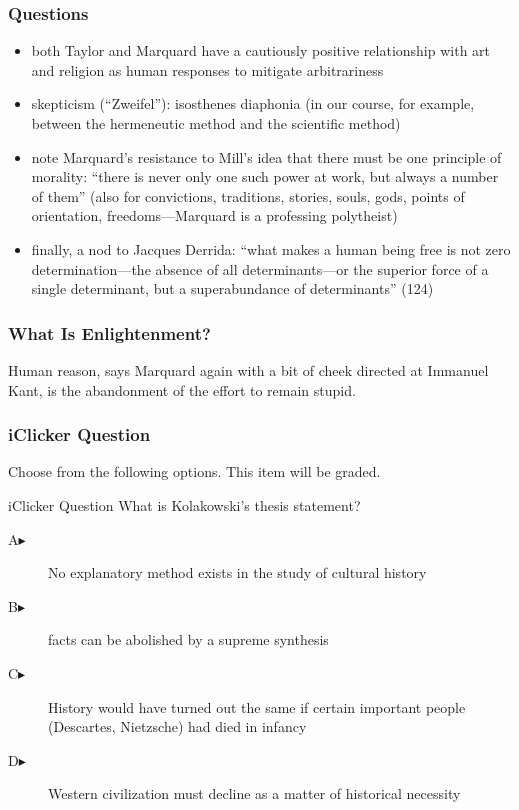 \documentclass[xcolor=dvipsnames]{beamer}
\begin{document}
\begin{frame}
  \frametitle{Questions}
  \begin{itemize}
  \item both Taylor and Marquard have a cautiously positive
    relationship with art and religion as human responses to mitigate
    arbitrariness
  \item skepticism (``Zweifel''): isosthenes diaphonia (in our course,
    for example, between the hermeneutic method and the scientific
    method)
  \item note Marquard's resistance to Mill's idea that there must be
    one principle of morality: ``there is never only one such power at
    work, but always a number of them'' (also for convictions,
    traditions, stories, souls, gods, points of orientation,
    freedoms---Marquard is a professing polytheist)
  \item finally, a nod to Jacques Derrida: ``what makes a human being
    free is not zero determination---the absence of all
    determinants---or the superior force of a single determinant, but
    a superabundance of determinants'' (124)
  \end{itemize}
\end{frame}

\begin{frame}
  \frametitle{What Is Enlightenment?}
  Human reason, says Marquard again with a bit of cheek directed at
  Immanuel Kant, is \alert{the abandonment of the effort to remain
    stupid}.
\end{frame}

\begin{frame}
  \frametitle{iClicker Question}
Choose from the following options. This item will be graded.
\begin{block}{iClicker Question}
What is Kolakowski's thesis statement?
\end{block}
\begin{description}
\item[A\hspace{.2in}$\blacktriangleright$] No explanatory method exists in the study of cultural history
\item[B\hspace{.2in}$\blacktriangleright$] facts can be abolished by a supreme synthesis
\item[C\hspace{.2in}$\blacktriangleright$] History would have turned out the same if certain important people (Descartes, Nietzsche) had died in infancy
\item[D\hspace{.2in}$\blacktriangleright$] Western civilization must decline as a matter of historical necessity
\end{description}
\end{frame}
\end{document}
